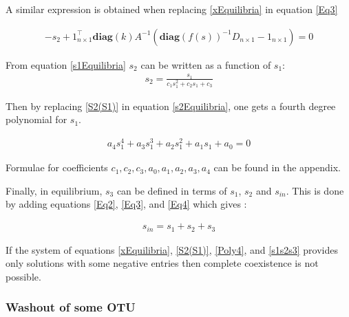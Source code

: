 \documentclass[3p,times]{elsarticle}
\newcommand{\diag}{\textbf{diag}}
\begin{document}
A similar expression is obtained when replacing \eqref{xEquilibria} in equation \eqref{Eq3}

\begin{align}
\label{s2Equilibria}-s_2+
1_{n\times 1}^{\top}\diag (k)  A^{-1}(\diag(f(s))^{-1}D_{n\times 1}-1_{n\times 1}) = 0
\end{align}

From equation \eqref{s1Equilibria} $s_2$ can be written as a function of $s_1$:
\begin{align}
s_2 = \frac{s_1}{c_1s_1^2+c_2s_1+c_3} \label{S2(S1)}
\end{align}


Then by replacing  \eqref{S2(S1)} in equation \eqref{s2Equilibria}, one gets a fourth degree polynomial for $s_1$. 

\begin{align}
\label{Poly4} a_4s_1^4+a_3s_1^3+a_2s_1^2+a_1s_1+a_0 = 0
\end{align}


Formulae for coefficients $c_1, c_2, c_3, a_0, a_1, a_2, a_3, a_4$ can be found in the appendix. 

Finally, in equilibrium, $s_3$ can be defined in terms of $s_1$, $s_2$ and $s_{in}$. This is done by adding equations \eqref{Eq2}, \eqref{Eq3},  and \eqref{Eq4} which gives :

\begin{align}
s_{in} = s_1+s_2+s_3 \label{s1s2s3}
\end{align}

If the system of equations \eqref{xEquilibria}, \eqref{S2(S1)}, \eqref{Poly4}, and \eqref{s1s2s3} provides only solutions with some negative entries then complete coexistence is not possible.

\subsubsection{Washout of some OTU}
\end{document}
